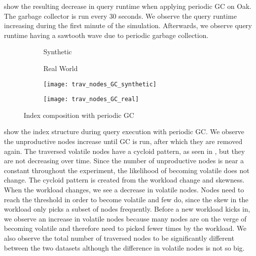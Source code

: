 \message{ !name(thesis.tex)}\documentclass[abstracton,12pt]{scrartcl}
\theoremstyle{definition}
\begin{document}
 show the
resulting decrease in query runtime when applying periodic GC on Oak. The
garbage collector is run every 30 seconds. We observe the query runtime
increasing during the first minute of the simulation. Afterwards, we observe
query runtime having a sawtooth wave due to periodic garbage collection.

\begin{figure}[H]
  \centering
  \begin{subfigure}{0.49\linewidth}
    \centering Synthetic
  \end{subfigure}
  \begin{subfigure}{0.49\linewidth}
    \centering Real World
  \end{subfigure}
  \begin{subfigure}{0.49\linewidth}
    \texttt{[image: trav\_nodes\_GC\_synthetic]}
    \caption{}
    \label{fig:trav_nodes_GC_synthetic}
  \end{subfigure}
  \begin{subfigure}{0.49\linewidth}
    \texttt{[image: trav\_nodes\_GC\_real]}
    \caption{}
    \label{fig:trav_nodes_GC_real}
  \end{subfigure}
  \caption{Index composition with periodic GC}
\end{figure}

 show the index
structure during query execution with periodic GC. We observe the unproductive
nodes increase until GC is run, after which they are removed again. The traversed 
volatile nodes have a cycloid pattern, as seen in
, but they are
not decreasing over time. Since the number of unproductive nodes is near a
constant throughout the experiment, the likelihood of becoming volatile does not
change. The cycloid pattern is created from the workload change and skewness.
When the workload changes, we see a decrease in volatile nodes. Nodes need to
reach the threshold in order to become volatile and few do, since the skew in
the workload only picks a subset of nodes frequently. Before a new workload
kicks in, we observe an increase in volatile nodes because many nodes are on the
verge of becoming volatile and therefore need to picked fewer times by the
workload. We also observe the total number of traversed nodes to be
significantly different between the two datasets although the difference in
volatile nodes is not so big.
\end{document}
